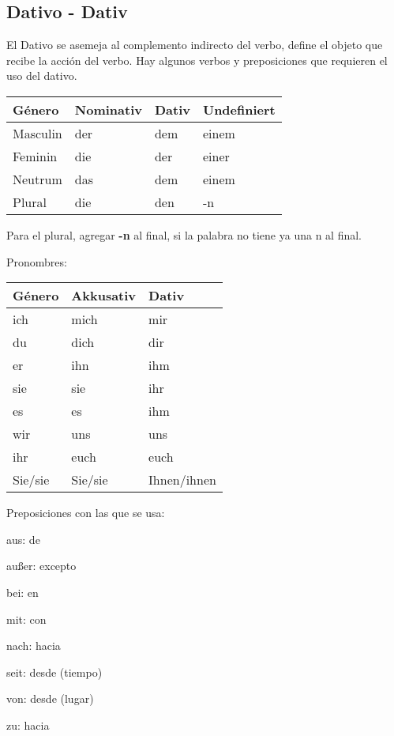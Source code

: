 \subsection{Dativo - Dativ}
El Dativo se asemeja al complemento indirecto del verbo, define el objeto que recibe la acción del verbo. Hay algunos verbos y preposiciones que requieren el uso del dativo.

\begin{tabular}{| l | l | l | l |}
\hline
\textbf{Género} & \textbf{Nominativ} & \textbf{Dativ} & \textbf{Undefiniert}\\
\hline
Masculin & der & dem & einem  \\
Feminin & die &  der & einer \\
Neutrum & das & dem & einem \\
Plural & die & den & -n \\
\hline
\end{tabular}

Para el plural, agregar \textbf{-n} al final, si la palabra no tiene ya una n al final.

Pronombres:

\begin{tabular}{| l | l | l |}
\hline
\textbf{Género} & \textbf{Akkusativ} & \textbf{Dativ} \\
\hline
ich & mich & mir \\
du & dich & dir \\
er & ihn & ihm \\
sie & sie & ihr \\
es & es & ihm \\
wir & uns & uns \\
ihr & euch & euch \\
Sie/sie & Sie/sie & Ihnen/ihnen \\
\hline
\end{tabular}

Preposiciones con las que se usa:
\begin{multicols}{3}
\begin{myitemize}
\item aus: de
\item außer: excepto
\item bei: en
\item mit: con
\item nach: hacia
\item seit: desde (tiempo)
\item von: desde (lugar)
\item zu: hacia
\end{myitemize}
\end{multicols}


